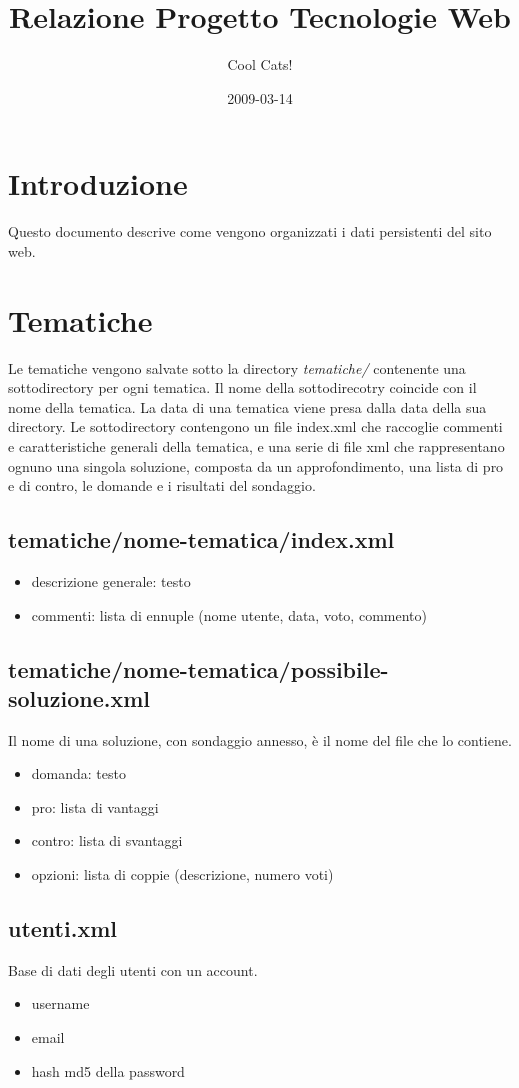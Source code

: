 \documentclass[a4paper,10pt]{article}
\author{Cool Cats!}
\title{Relazione Progetto Tecnologie Web}
\date{2009-03-14}
\begin{document}
\maketitle

\section{Introduzione}
Questo documento descrive come vengono organizzati i dati persistenti del sito web.

\section{Tematiche}
Le tematiche vengono salvate sotto la directory \textit{tematiche/} contenente una sottodirectory per ogni tematica. Il nome della sottodirecotry coincide con il nome della tematica. La data di una tematica viene presa dalla data della sua  directory.
Le sottodirectory contengono un file index.xml che raccoglie commenti e caratteristiche generali della tematica, e una serie di file xml che rappresentano ognuno una singola soluzione, composta da un approfondimento, una lista di pro e di contro, le domande e i risultati del sondaggio.
\subsection{tematiche/nome-tematica/index.xml}
\begin{itemize}
 \item descrizione generale: testo
 \item commenti: lista di ennuple (nome utente, data, voto, commento)
\end{itemize}
\subsection{tematiche/nome-tematica/possibile-soluzione.xml}
Il nome di una soluzione, con sondaggio annesso, \`e il nome del file che lo contiene.
\begin{itemize}
 \item domanda: testo
 \item pro: lista di vantaggi
 \item contro: lista di svantaggi
 \item opzioni: lista di coppie (descrizione, numero voti)
\end{itemize}

\subsection{utenti.xml}
Base di dati degli utenti con un account.
\begin{itemize}
 \item username
 \item email
 \item hash md5 della password
\end{itemize}
\end{document}
